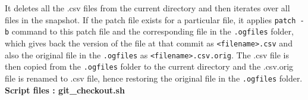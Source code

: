 \documentclass{article}
\begin{document}
It deletes all the .csv files from the current directory and then iterates over all files in the snapshot. If the patch file exists for a particular file, it applies \verb"patch -b" command to this patch file and the corresponding file in the \verb".ogfiles" folder, which gives back the version of the file at that commit as \verb"<filename>.csv" and also the original file in the \verb".ogfiles" as \verb"<filename>.csv.orig".
The .csv file is then copied from the \verb".ogfiles" folder to the current directory and the .csv.orig file is renamed to .csv file, hence restoring the original file in the \verb".ogfiles" folder.\\

\textbf{Script files : git\_checkout.sh}
\end{document}
